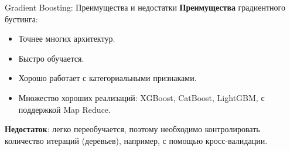 \documentclass[notheorems, handout]{beamer}
\begin{document}
\begin{frame}{Gradient Boosting: Преимущества и недостатки }
\textbf{Преимущества} градиентного бустинга:\medskip
\begin{itemize}
	\item Точнее многих архитектур.\medskip
	\item Быстро обучается.\medskip
	\item Хорошо работает с категориальными признаками.\medskip
	\item Множество хороших реализаций: XGBoost, CatBoost, LightGBM, с поддержкой Map Reduce.
\end{itemize}
\medskip
\textbf{Недостаток}: легко переобучается, поэтому необходимо контролировать количество итераций (деревьев), например, с помощью кросс-валидации.
\end{frame}
\end{document}

